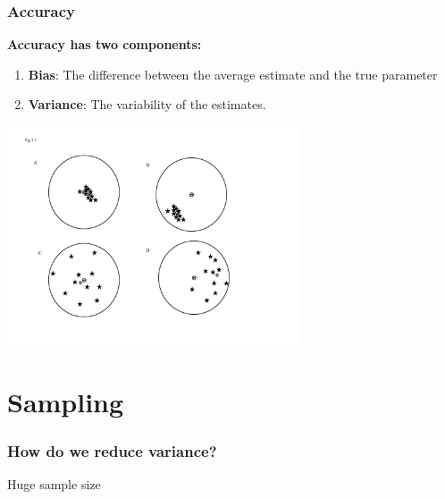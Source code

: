 \documentclass[color=usenames,dvipsnames]{beamer}\usepackage[]{graphicx}\usepackage[]{xcolor}
\begin{document}
\begin{frame}
  \frametitle{Accuracy}
  {\bf \large Accuracy has two components: \par}
  \begin{enumerate}[\bf (1)]
    \normalsize
    \item {\bf Bias}: The difference between the average estimate and
      the true parameter \par
    \item {\bf Variance}: The variability of the estimates.
  \end{enumerate}
  \pause
  \centering
  \includegraphics[width=0.65\textwidth]{figs/bulls-eye.jpg} \\
\end{frame}






\section{Sampling}



\begin{frame}
  \frametitle{How do we reduce variance?}
  \pause
  \begin{center}
    \Huge Huge sample size
  \end{center}
\end{frame}
\end{document}
